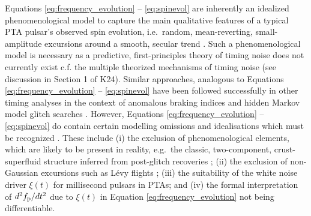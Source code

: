 \documentclass[fleqn,usenatbib,useAMS]{mnras}
\begin{document}
Equations \eqref{eq:frequency_evolution} -- \eqref{eq:spinevol} are inherently an idealized phenomenological model to capture the main qualitative features of a typical PTA pulsar's observed spin evolution, i.e.\ random, mean-reverting, small-amplitude excursions around a smooth, secular trend \citep{NANOgrav2023,EPTA2023,Zic2023arXiv230616230Z}. Such a phenomenological model is necessary as a predictive, first-principles theory of timing noise does not currently exist c.f. the multiple theorized mechanisms of timing noise (see discussion in Section 1 of K24). Similar approaches, analogous to Equations \eqref{eq:frequency_evolution} -- \eqref{eq:spinevol} have been followed successfully in other timing analyses in the context of anomalous braking indices \citep{Vargas} and hidden Markov model glitch searches \citep{Melatos2020ApJ...896...78M,Lower2021MNRAS.508.3251L,Dunn2022,Dunn2023MNRAS.522.5469D}. However, Equations \eqref{eq:frequency_evolution} -- \eqref{eq:spinevol} do contain certain modelling omissions and idealisations which must be recognized \citep{Meyers2021,Myers2021MNRAS.502.3113M,Vargas}. These include (i) the exclusion of phenomenological elements, which are likely to be present in reality, e.g.\ the classic, two-component, crust-superfluid structure inferred from post-glitch recoveries \citep{Baym1969,vanEysden,Alpar2017MNRAS.471.4827G,Myers2021MNRAS.502.3113M,Meyers2021}; (ii) the exclusion of non-Gaussian excursions such as L\'{e}vy flights \citep{Sornette2004}; (iii) the suitability of the white noise driver $\xi(t)$ for millisecond pulsars in PTAs; and (iv) the formal interpretation of $d^2 f_{\rm p} / dt^2$ due to $\xi(t)$ in Equation \eqref{eq:frequency_evolution} not being differentiable.
\end{document}
